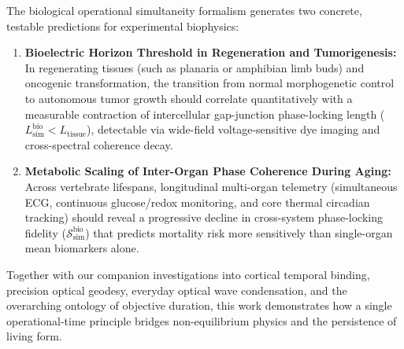 \documentclass[11pt,a4paper]{article}
\begin{document}
The biological operational simultaneity formalism generates two concrete, testable predictions for experimental biophysics:
\begin{enumerate}
    \item \textbf{Bioelectric Horizon Threshold in Regeneration and Tumorigenesis:} In regenerating tissues (such as planaria or amphibian limb buds) and oncogenic transformation, the transition from normal morphogenetic control to autonomous tumor growth should correlate quantitatively with a measurable contraction of intercellular gap-junction phase-locking length ($L_{\mathrm{sim}}^{\mathrm{bio}} < L_{\mathrm{tissue}}$), detectable via wide-field voltage-sensitive dye imaging and cross-spectral coherence decay.
    \item \textbf{Metabolic Scaling of Inter-Organ Phase Coherence During Aging:} Across vertebrate lifespans, longitudinal multi-organ telemetry (simultaneous ECG, continuous glucose/redox monitoring, and core thermal circadian tracking) should reveal a progressive decline in cross-system phase-locking fidelity ($\mathcal{S}_{\mathrm{sim}}^{\mathrm{bio}}$) that predicts mortality risk more sensitively than single-organ mean biomarkers alone.
\end{enumerate}

Together with our companion investigations into cortical temporal binding, precision optical geodesy, everyday optical wave condensation, and the overarching ontology of objective duration, this work demonstrates how a single operational-time principle bridges non-equilibrium physics and the persistence of living form.
\end{document}
